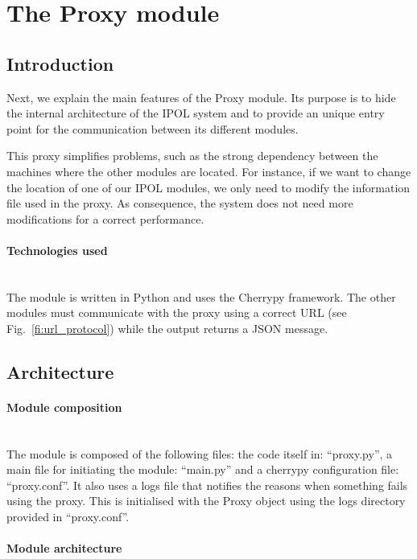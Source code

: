 \section{The Proxy module}

\subsection{Introduction}
\label{sec:proxy_introduction}

Next, we explain the main features of the Proxy module. Its purpose is to hide the internal architecture of the IPOL system and to provide an unique entry point for the communication between its different modules. 

This proxy simplifies problems, such as the strong dependency between the machines where the other modules are located. For instance, if we want to change the location of one of our IPOL modules, we only need to modify the information file used in the proxy. As consequence, the system does not need more modifications for a correct performance.

\paragraph{Technologies used} \hspace{0pt} \\
The module is written in Python and uses the Cherrypy framework. The other modules must communicate with the proxy using a correct URL (see Fig.~\ref{fi:url_protocol}) while the output returns a JSON message.

\subsection{Architecture}

\paragraph{Module composition} \hspace{0pt} \\
The module is composed of the following files: the code itself in: “proxy.py”, a main file for initiating the module: “main.py” and a cherrypy configuration file: “proxy.conf”. It also uses a logs file that notifies the reasons when something fails using the proxy. This is initialised with the Proxy object using the logs directory provided in “proxy.conf”.

\paragraph{Module architecture} \hspace{0pt} \\

